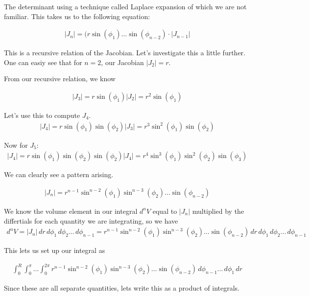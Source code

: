 \documentclass{article}
\begin{document}
The determinant using a technique called Laplace expansion of which we are not familiar. This takes us to the following equation:

\begin{align*}
    |J_n| = (r\sin(\phi_1)\dots\sin(\phi_{n-2})\cdot|J_{n-1}|
\end{align*}

This is a recursive relation of the Jacobian. Let's investigate this a little further. One can easiy see that for $n=2$, our Jacobian $|J_2| = r$.

From our recursive relation, we know 

\begin{align*}
|J_3| = r\sin(\phi_1)|J_2| = r^2\sin(\phi_1)
\end{align*}

Let's use this to compute $J_4$. 
\begin{align*}
|J_4| = r\sin(\phi_1)\sin(\phi_2)|J_3| = r^3\sin^2(\phi_1)\sin(\phi_2)
\end{align*}

Now for $J_5$:
\begin{align*}
|J_4| = r\sin(\phi_1)\sin(\phi_2)\sin(\phi_2)|J_4| = r^4\sin^3(\phi_1)\sin^2(\phi_2)\sin(\phi_3)
\end{align*}

We can clearly see a pattern arising.

\begin{align*}
    |J_n| = r^{n-1}\sin^{n-2}(\phi_1)\sin^{n-3}(\phi_2)\dots\sin(\phi_{n-2})
\end{align*}

We know the volume element in our integral $d^nV$ equal to $|J_n|$ multiplied by the differtials for each quantity we are integrating, so we have
\begin{align*}
    d^nV = |J_n|\,dr\,d\phi_1\,d\phi_2\dots\,d\phi_{n-1} =r^{n-1}\sin^{n-2}(\phi_1)\sin^{n-3}(\phi_2)\dots\sin(\phi_{n-2})\,dr\,d\phi_1\,d\phi_2\dots\,d\phi_{n-1}
\end{align*}

This lets us set up our integral as

\begin{align*}
\int_{0}^{R}\int_{0}^{\pi}\dots\int_{0}^{2\pi}r^{n-1}\sin^{n-2}(\phi_1)\sin^{n-3}(\phi_2)\dots\sin(\phi_{n-2})\,d\phi_{n-1}\dots\,d\phi_1\,dr
\end{align*}

Since these are all separate quantities, lets write this as a product of integrals.
\end{document}
